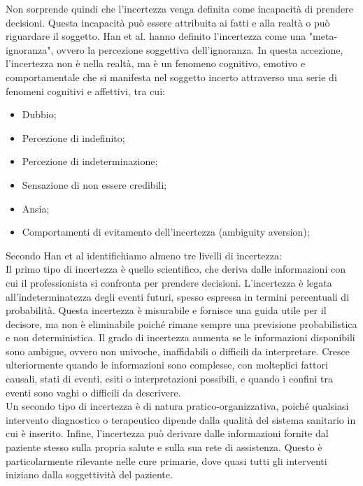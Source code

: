 Non sorprende quindi che l'incertezza venga definita come incapacità di prendere decisioni. Questa incapacità può essere attribuita ai fatti e alla realtà o può riguardare il soggetto. Han et al. hanno definito l'incertezza come una "meta-ignoranza", ovvero la percezione soggettiva dell'ignoranza. In questa accezione, l'incertezza non è nella realtà, ma è un fenomeno cognitivo, emotivo e comportamentale che si manifesta nel soggetto incerto attraverso una serie di fenomeni cognitivi e affettivi, tra cui:

\begin{itemize}
    \item Dubbio;
    \item Percezione di indefinito;
    \item Percezione di indeterminazione;
    \item Sensazione di non essere credibili;
    \item Ansia;
    \item Comportamenti di evitamento dell'incertezza (ambiguity aversion);
\end{itemize}

Secondo Han et al identifichiamo almeno tre livelli di incertezza: \\
Il primo tipo di incertezza è quello scientifico, che deriva dalle informazioni con cui il professionista si confronta per prendere decisioni. L'incertezza è legata all'indeterminatezza degli eventi futuri, spesso espressa in termini percentuali di probabilità. Questa incertezza è misurabile e fornisce una guida utile per il decisore, ma non è eliminabile poiché rimane sempre una previsione probabilistica e non deterministica. Il grado di incertezza aumenta se le informazioni disponibili sono ambigue, ovvero non univoche, inaffidabili o difficili da interpretare. Cresce ulteriormente quando le informazioni sono complesse, con molteplici fattori causali, stati di eventi, esiti o interpretazioni possibili, e quando i confini tra eventi sono vaghi o difficili da descrivere.\\

Un secondo tipo di incertezza è di natura pratico-organizzativa, poiché qualsiasi intervento diagnostico o terapeutico dipende dalla qualità del sistema sanitario in cui è inserito. Infine, l'incertezza può derivare dalle informazioni fornite dal paziente stesso sulla propria salute e sulla sua rete di assistenza. Questo è particolarmente rilevante nelle cure primarie, dove quasi tutti gli interventi iniziano dalla soggettività del paziente.\\

